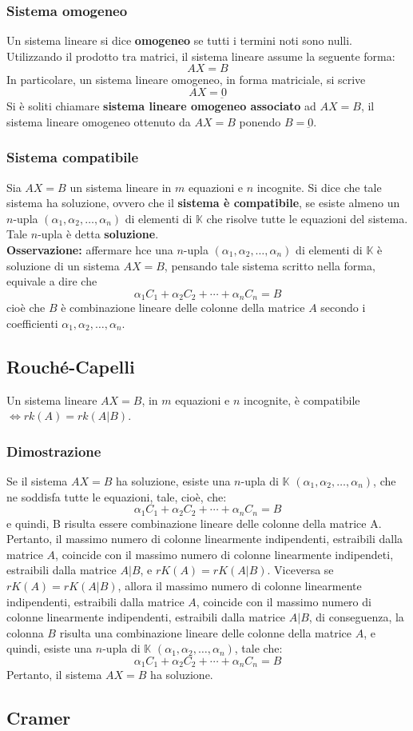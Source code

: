 \documentclass{article}
\newcommand{\s}[2]{#1_1, #1_2, \ldots, #1_{#2}}
\newcommand{\ah}{\alpha}
\begin{document}
\subsubsection{Sistema omogeneo}
Un sistema lineare si dice \textbf{omogeneo} se tutti i termini noti sono
nulli. Utilizzando il prodotto tra matrici, il sistema lineare assume la
seguente forma:
\[
    AX = B
\]
In particolare, un sistema lineare omogeneo, in forma matriciale, si scrive
\[
    AX = \underbar{0}
\]
Si è soliti chiamare \textbf{sistema lineare omogeneo associato} ad $AX = B$,
il sistema lineare omogeneo ottenuto da $AX = B$ ponendo $B = \underbar{0}$.

\subsubsection{Sistema compatibile}
Sia $AX = B$ un sistema lineare in $m$ equazioni e $n$ incognite. Si dice che
tale sistema ha soluzione, ovvero che il \textbf{sistema è compatibile}, se
esiste almeno un $n$-upla $ (\s{\ah}{n})$ di elementi di $\mathbb{K}$ che
risolve tutte le equazioni del sistema. Tale $n$-upla è detta
\textbf{soluzione}.\\ \textbf{Osservazione:} affermare hce una $n$-upla $
    (\s{\ah}{n})$ di elementi di $\mathbb{K}$ è soluzione di un sistema $AX = B$,
pensando tale sistema scritto nella forma, equivale a dire che
\[
    \ah_1C_1 + \ah_2C_2 + \cdots + \ah_nC_n = B
\]
cioè che $B$ è combinazione lineare delle colonne della matrice $A$ secondo i
coefficienti $\ah_1, \ah_2, \ldots, \ah_n$.

\subsection{Rouché-Capelli}
Un sistema lineare $AX = B$, in $m$ equazioni e $n$ incognite, è compatibile
$\iff rk (A) = rk (A|B)$.

\subsubsection{Dimostrazione}
Se il sistema $AX = B$ ha soluzione, esiste una $n$-upla di $\mathbb{K}$ $
    (\s{\ah}{n})$, che ne soddisfa tutte le equazioni, tale, cioè, che:
\[
    \ah_1C_1 + \ah_2C_2 + \cdots + \ah_nC_n = B
\]
e quindi, B risulta essere combinazione lineare delle colonne della matrice A.
Pertanto, il massimo numero di colonne linearmente indipendenti, estraibili
dalla matrice $A$, coincide con il massimo numero di colonne linearmente
indipendeti, estraibili dalla matrice $A|B$, e $rK (A) = rK (A|B)$. Viceversa
se $rK (A) = rK (A|B)$, allora il massimo numero di colonne linearmente
indipendenti, estraibili dalla matrice $A$, coincide con il massimo numero di
colonne linearmente indipendenti, estraibili dalla matrice $A|B$, di
conseguenza, la colonna $B$ risulta una combinazione lineare delle colonne
della matrice $A$, e quindi, esiste una $n$-upla di $\mathbb{K}$ $
    (\s{\ah}{n})$, tale che:
\[
    \ah_1C_1+\ah_2C_2+\cdots+\ah_nC_n = B
\]
Pertanto, il sistema $AX = B$ ha soluzione.

\subsection{Cramer}
\end{document}

